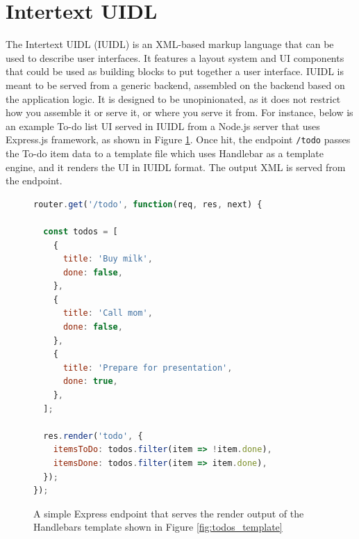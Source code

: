 
\section{Intertext UIDL} \label{intertextUIDL}

The Intertext UIDL (IUIDL) is an XML-based markup language that can be used to describe user interfaces. It features a layout system and UI components that could be used as building blocks to put together a user interface. IUIDL is meant to be served from a generic backend, assembled on the backend based on the application logic. It is designed to be unopinionated, as it does not restrict how you assemble it or serve it, or where you serve it from. For instance, below is an example To-do list UI served in IUIDL from a Node.js server that uses Express.js framework, as shown in Figure \ref{fig:todos_js}. Once hit, the endpoint \texttt{/todo} passes the To-do item data to a template file which uses Handlebar as a template engine, and it renders the UI in IUIDL format. The output XML is served from the endpoint.

\begin{figure}
\begin{minipage}{\linewidth}
\begin{lstlisting}[language=javascript]
router.get('/todo', function(req, res, next) {

  const todos = [
    {
      title: 'Buy milk',
      done: false,
    },
    {
      title: 'Call mom',
      done: false,
    },
    {
      title: 'Prepare for presentation',
      done: true,
    },
  ];

  res.render('todo', {
    itemsToDo: todos.filter(item => !item.done),
    itemsDone: todos.filter(item => item.done),
  });
});
\end{lstlisting}
\end{minipage}
\caption{A simple Express endpoint that serves the render output of the Handlebars template shown in Figure \ref{fig:todos_template}}%
\label{fig:todos_js}%
\end{figure}


